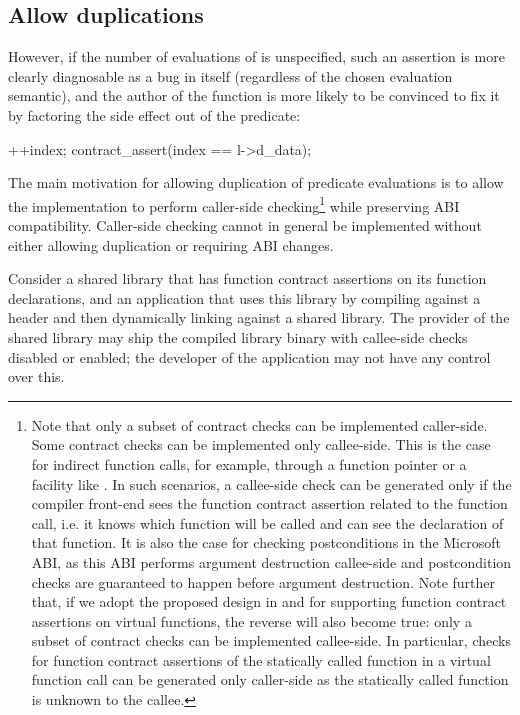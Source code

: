 \subsection{Allow duplications}
\label{subsec:ville}


However, if the number of evaluations of  is  unspecified, such an assertion is more clearly diagnosable as a bug in itself (regardless of the chosen evaluation semantic), and the author of the function  is more likely to be convinced to fix it by factoring the side effect out of the predicate:
\begin{codeblock}
++index;
contract_assert(index == l->d_data);
\end{codeblock}



The main motivation for allowing duplication of predicate evaluations is to allow the implementation to perform caller-side checking\footnote{Note that only a subset of contract checks can be implemented caller-side. Some contract checks can be implemented only callee-side. This is the case for indirect function calls, for example, through a function pointer or a facility like . In such scenarios, a callee-side check can be generated only if the compiler front-end sees the function contract assertion related to the function call, i.e. it knows which function will be called and can see the declaration of that function. It is also the case for checking postconditions in the Microsoft ABI, as this ABI performs argument destruction callee-side and postcondition checks are guaranteed to happen before argument destruction. Note further that, if we adopt the proposed design in \cite{P3097R0} and \cite{P3165R0} for supporting function contract assertions on virtual functions, the reverse will also become true: only a subset of contract checks can be implemented callee-side. In particular, checks for function contract assertions of the statically called function in a virtual function call can be generated only caller-side as the statically called function is unknown to the callee.} while preserving ABI compatibility. Caller-side checking cannot in general be implemented without either allowing duplication or requiring ABI changes.

Consider a shared library that has function contract assertions on its function declarations, and an application that uses this library by compiling against a header and then dynamically linking against a shared library. The provider of the shared library may ship the compiled library binary with callee-side checks disabled or enabled; the developer of the application may not have any control over this.

